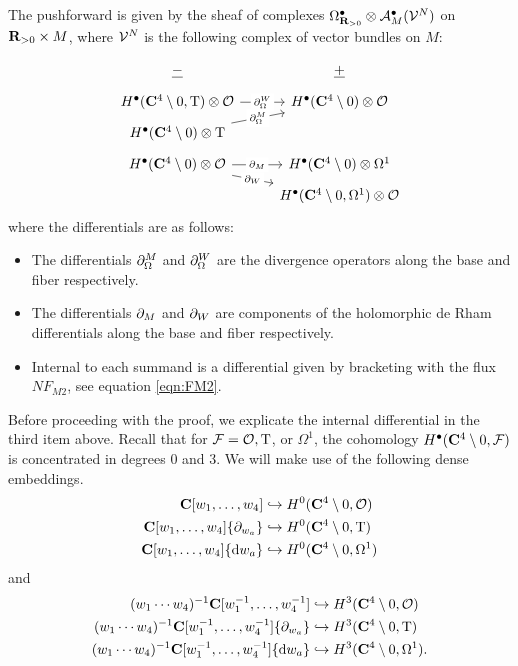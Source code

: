 \documentclass[../main.tex]{subfiles}
\begin{document}
\begin{prop}\label{prop:pushads4}
The pushforward is given by the sheaf of complexes $\Omega^\bullet_{\mathbf{R}_{>0}} \otimes \mathcal A^{\bullet}_{M} (\mathcal{V}^N)$ on $\mathbf{R}_{>0}\times M$, where $\mathcal{V}^N$ is the following complex of vector bundles on $M$:

\begin{equation}
  \begin{tikzcd}[row sep = 1 ex]
    \ul{-} & \ul{+} \\ 
H^\bullet (\C^{4}\setminus 0, \T) \otimes \mc{O}\ar[r, "\del^W_\Omega" description] & H^\bullet (\C^{4}\setminus 0) \otimes \mc O \\
H^\bullet (\C^{4}\setminus 0)  \otimes \T\ar[ur, "\del^M_\Omega" description] \\
H^\bullet (\C^{4}\setminus 0)\otimes \mc{O}\ar[r, "\del_M" description]\ar[dr, "\del_W" description] & H^\bullet (\C^{4}\setminus 0) \otimes \Omega^1 \\ & H^\bullet (\C^{4}\setminus 0, \Omega^1)  \otimes \mc O
\end{tikzcd}
\end{equation}
where the differentials are as follows:
\begin{itemize}
\item The differentials $\partial_\Omega^M$ and $\partial_\Omega^W$ are the divergence operators along the base and fiber respectively.
\item The differentials $\partial_M$ and $\partial_W$ are components of the holomorphic de Rham differentials along the base and fiber respectively.
\item  Internal to each summand is a differential given by bracketing with the flux $NF_{M2}$, see equation \eqref{eqn:FM2}. 
\end{itemize}
\end{prop} 

Before proceeding with the proof, we explicate the internal differential in the third item above. Recall that for $\mathcal{F} = \mathcal{O}, {\mathrm{T}}$, or $\Omega^1$, the cohomology $H^\bullet(\mathbf{C}^4 \setminus 0, \mathcal{F})$ is concentrated in degrees $0$ and $3$. We will make use of the following dense embeddings.
\begin{align*}
\mathbf{C}[w_1,\ldots, w_4] & \hookrightarrow H^0(\mathbf{C}^4 \setminus 0, \mathcal{O}) \\ 
\mathbf{C}[w_1,\ldots, w_4] \{\partial_{w_a}\} & \hookrightarrow H^0(\mathbf{C}^4 \setminus 0, {\mathrm{T}}) \\
\mathbf{C}[w_1,\ldots, w_4] \{\mathrm{d} w_a\} & \hookrightarrow H^0(\mathbf{C}^4 \setminus 0, \Omega^1) 
\end{align*}
and
\begin{align*}
(w_1\cdots w_4)^{-1} \mathbf{C}[w_1^{-1},\ldots, w_4^{-1}] & \hookrightarrow H^3(\mathbf{C}^4 \setminus 0, \mathcal{O}) \\ 
(w_1\cdots w_4)^{-1} \mathbf{C}[w_1^{-1},\ldots, w_4^{-1}] \{\partial_{w_a}\} & \hookrightarrow H^3(\mathbf{C}^4 \setminus 0, {\mathrm{T}}) \\
(w_1\cdots w_4)^{-1} \mathbf{C}[w_1^{-1},\ldots, w_4^{-1}] \{\mathrm{d} w_a\} & \hookrightarrow H^3(\mathbf{C}^4 \setminus 0, \Omega^1) .
\end{align*}
\end{document}
